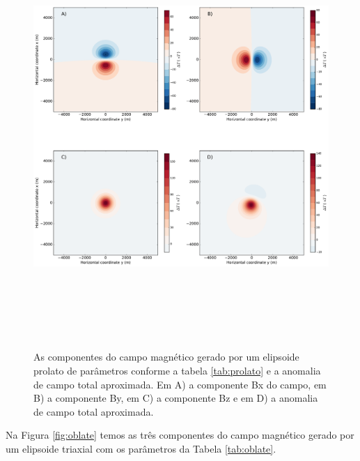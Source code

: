 \begin{figure}[hbt!]
	\centering \includegraphics[width=16cm,height=16cm]{figures/ellipsoid_prolate}
	\caption[As componentes do campo magnético gerado por um elipsoide prolato e a anomalia de campo total aproximada.]{As componentes 
		do campo magnético gerado por um elipsoide prolato de parâmetros conforme a tabela \ref{tab:prolato} e a anomalia de campo total aproximada. Em A) a componente Bx do campo, em B) a componente By, em C) a componente Bz e em D) a anomalia de campo total aproximada.}
	\label{fig:prolate}
\end{figure}

Na Figura \ref{fig:oblate} temos as três componentes do campo magnético gerado por um elipsoide triaxial com os parâmetros da Tabela \ref{tab:oblate}.

